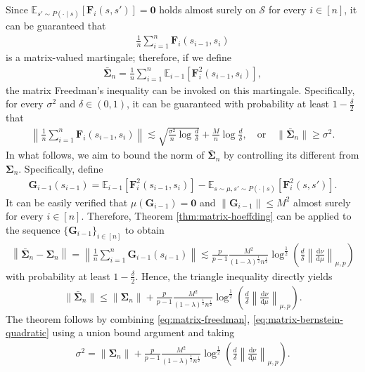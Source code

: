 
Since $\mathbb{E}_{s' \sim P(\cdot \mid s)}[\bm{F}_i(s,s')] = \bm{0}$ holds almost surely on $\mathcal{S}$ for every $i \in [n]$, it can be guaranteed that
\begin{align*}
\frac{1}{n}\sum_{i=1}^n \bm{F}_i(s_{i-1},s_i)
\end{align*}
is a matrix-valued martingale; therefore, if we define
\begin{align*}
\bar{\bm{\Sigma}}_n = \frac{1}{n}\sum_{i=1}^n\mathbb{E}_{i-1}[\bm{F}_i^2(s_{i-1},s_i)],
\end{align*}
the matrix Freedman's inequality can be invoked on this martingale. Specifically, for every $\sigma^2$ and $\delta \in (0,1)$, it can be guaranteed with probability at least $1-\frac{\delta}{2}$ that
\begin{align}\label{eq:matrix-freedman}
\left\|\frac{1}{n}\sum_{i=1}^n \bm{F}_i(s_{i-1},s_i)\right\| \lesssim \sqrt{\frac{\sigma^2}{n}\log \frac{d}{\delta}} + \frac{M}{n} \log \frac{d}{\delta}, \quad \text{or} \quad \|\bar{\bm{\Sigma}}_n\| \geq \sigma^2.
\end{align}
In what follows, we aim to bound the norm of $\bar{\bm{\Sigma}}_n$ by controlling its different from $\bm{\Sigma}_n$. Specifically, define
\begin{align*}
\bm{G}_{i-1}(s_{i-1}) = \mathbb{E}_{i-1} [\bm{F}_i^2(s_{i-1},s_i)] - \mathbb{E}_{s \sim \mu, s' \sim P(\cdot \mid s)} [\bm{F}_i^2(s,s')].
\end{align*}
It can be easily verified that $\mu(\bm{G}_{i-1}) = \bm{0}$ and $\|\bm{G}_{i-1}\| \leq M^2$ almost surely for every $i \in [n]$. Therefore, Theorem \ref{thm:matrix-hoeffding} can be applied to the sequence $\{\bm{G}_{i-1}\}_{i \in [n]}$ to obtain
\begin{align*}
\left\|\bar{\bm{\Sigma}}_n - \bm{\Sigma}_n\right\| = \left\|\frac{1}{n}\sum_{i=1}^n \bm{G}_{i-1}(s_{i-1})\right\| \lesssim \frac{p}{p-1}\frac{M^2}{(1-\lambda)^{\frac{1}{2}}n^{\frac{1}{2}}}\log^{\frac{1}{2}}\left(\frac{d}{\delta}\left\|\frac{\mathrm{d}\nu}{\mathrm{d}\mu}\right\|_{\mu,p}\right)
\end{align*}
with probability at least $1-\frac{\delta}{2}$. Hence, the triangle inequality directly yields
\begin{align}\label{eq:matrix-bernstein-quadratic}
\|\bar{\bm{\Sigma}}_n\|\leq \|\bm{\Sigma}_n\| + \frac{p}{p-1} \frac{M^2}{(1-\lambda)^{\frac{1}{2}}n^{\frac{1}{2}}}\log^{\frac{1}{2}}\left(\frac{d}{\delta}\left\|\frac{\mathrm{d}\nu}{\mathrm{d}\mu}\right\|_{\mu,p}\right).
\end{align}
The theorem follows by combining \eqref{eq:matrix-freedman}, \eqref{eq:matrix-bernstein-quadratic} using a union bound argument and taking
\begin{align*}
\sigma^2 = \|\bm{\Sigma}_n\| + \frac{p}{p-1} \frac{M^2}{(1-\lambda)^{\frac{1}{2}}n^{\frac{1}{2}}}\log^{\frac{1}{2}}\left(\frac{d}{\delta}\left\|\frac{\mathrm{d}\nu}{\mathrm{d}\mu}\right\|_{\mu,p}\right).
\end{align*}

